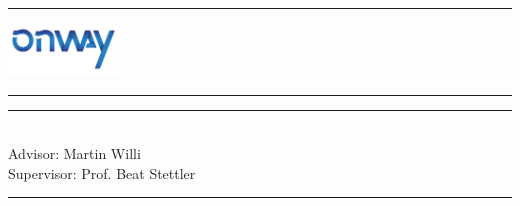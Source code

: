 
\hrule
\begin{minipage}{0.5\linewidth}
\end{minipage}
%
\begin{minipage}[c][][b]{0.49\linewidth}
\begin{flushright}
	\includegraphics[height=1.4cm]{images/onway_logo}
\end{flushright}
\end{minipage}
\hrule
\begin{center}
   	\begin{flushright}
   		\sffamily
   		{\Huge\sffamily\bfseries\subjectinfo\par}
   		\par\noindent\rule[-1ex]{\linewidth}{2pt}\par
		\vspace{0.5cm}
   		\emph{\huge\sffamily\titleinfo}
   		\vspace{1cm}\par
   		{\large\sffamily\authorinfo}\\
   		\vspace{1cm}
   		{\sffamily Advisor: Martin Willi}\\
   		{\sffamily Supervisor: Prof. Beat Stettler}\\
    \end{flushright}
   	\renewcommand\arraystretch{1.5}
   	\sffamily
\end{center}
\cfoot{}
\hrule
{
    \footnotesize 
    \begin{flushright}
        \dateinfo
    \end{flushright}
}

\restoregeometry
